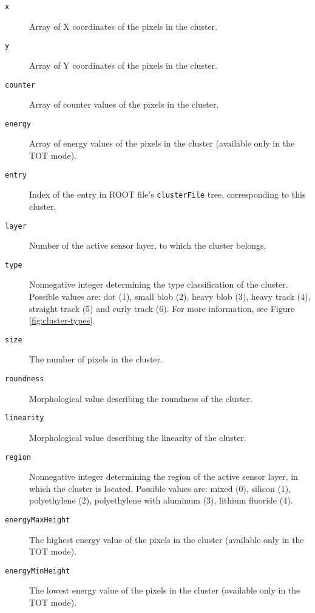 \begin{description}
	\item[\texttt{x}]
	Array of X coordinates of the pixels in the cluster.

	\item[\texttt{y}]
	Array of Y coordinates of the pixels in the cluster.

	\item[\texttt{counter}]
	Array of counter values of the pixels in the cluster.

	\item[\texttt{energy}]
	Array of energy values of the pixels in the cluster (available only in the TOT mode).

	\item[\texttt{entry}]
	Index of the entry in ROOT file's \texttt{clusterFile} tree, corresponding to this cluster.

	\item[\texttt{layer}]
	Number of the active sensor layer, to which the cluster belongs.

	\item[\texttt{type}]
	Nonnegative integer determining the type classification of the cluster. Possible values are: dot (1), small blob (2), heavy blob (3), heavy track (4), straight track (5) and curly track (6). For more information, see Figure \ref{fig:cluster-types}.

	\item[\texttt{size}]
	The number of pixels in the cluster.

	\item[\texttt{roundness}]
	Morphological value describing the roundness of the cluster.

	\item[\texttt{linearity}]
	Morphological value describing the linearity of the cluster.

	\item[\texttt{region}]
	Nonnegative integer determining the region of the active sensor layer, in which the cluster is located. Possible values are: mixed (0), silicon (1), polyethylene (2), polyethylene with aluminum (3), lithium fluoride (4).

	\item[\texttt{energyMaxHeight}]
	The highest energy value of the pixels in the cluster (available only in the TOT mode).

	\item[\texttt{energyMinHeight}]
	The lowest energy value of the pixels in the cluster (available only in the TOT mode).


\end{description}
